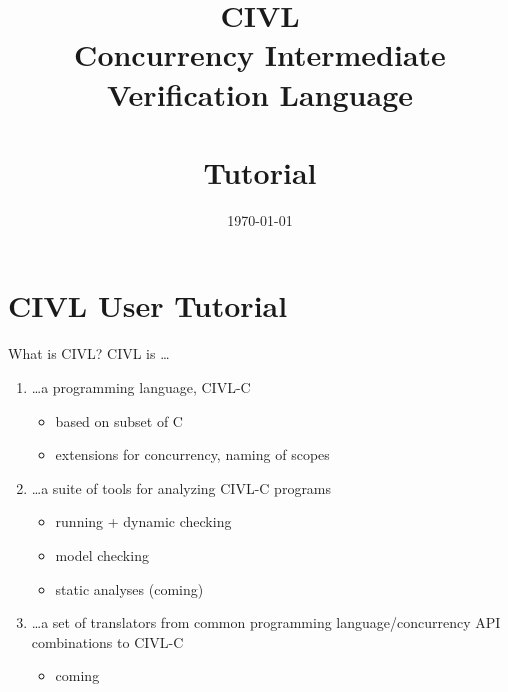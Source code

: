 \documentclass[t]{beamer}
\date{\today}
\title{{\huge\bf CIVL}\\
  Concurrency Intermediate Verification Language\\ \ \\
  Tutorial}
\begin{document}
\begin{frame}[plain]
  \titlepage
\end{frame}


\section{CIVL User Tutorial}

\begin{frame}{What is CIVL?}
  CIVL is \ldots
  \begin{enumerate}
  \item \ldots a programming language, \alert{CIVL-C}
    \begin{itemize}
    \item based on subset of C
    \item extensions for concurrency, naming of scopes
    \end{itemize}
  \item \ldots a suite of tools for analyzing CIVL-C programs
    \begin{itemize}
    \item running + dynamic checking
    \item model checking
    \item static analyses (coming)
    \end{itemize}
  \item \ldots a set of translators from common programming
    language/concurrency API combinations to CIVL-C
    \begin{itemize}
    \item coming
    \end{itemize}
  \end{enumerate}
\end{frame}
\end{document}
